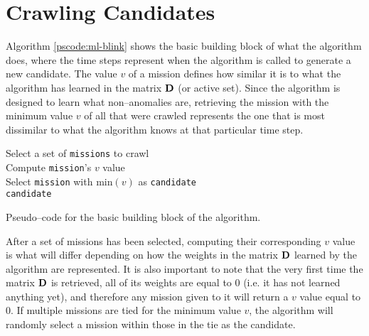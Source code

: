 \section{Crawling Candidates} \label{sect:meth:intro}

Algorithm \ref{pscode:ml-blink} shows the basic building block of what the \mlblink algorithm does, where the time steps represent when the algorithm is called to generate a new candidate. The value $v$ of a mission defines how similar it is to what the \mlblink algorithm has learned in the matrix $\boldsymbol{\mathbf{D}}$ (or active set). Since the \mlblink algorithm is designed to learn what non--anomalies are, retrieving the mission with the minimum value $v$ of all that were crawled represents the one that is most dissimilar to what the \mlblink algorithm knows at that particular time step.

\vspace{0.4cm}
\begin{algorithm}[H]
    \SetAlgoLined
        \FMain{} {
             {
                Select a set of \texttt{missions} to crawl \\
                 {
                    Compute \texttt{mission}'s $v$ value \\
                }
                Select \texttt{mission} with $\text{min}(v)$ as \texttt{candidate} \\
                \Return \texttt{candidate}
            }
        }
    \caption{Pseudo--code for the basic building block of the \mlblink algorithm.}
    \label{pscode:ml-blink}
\end{algorithm}
\vspace{0.4cm}

After a set of missions has been selected, computing their corresponding $v$ value is what will differ depending on how the weights in the matrix $\boldsymbol{\mathbf{D}}$ learned by the algorithm are represented. It is also important to note that the very first time the matrix $\boldsymbol{\mathbf{D}}$ is retrieved, all of its weights are equal to $0$ (i.e. it has not learned anything yet), and therefore any mission given to it will return a $v$ value equal to $0$. If multiple missions are tied for the minimum value $v$, the \mlblink algorithm will randomly select a mission within those in the tie as the candidate.